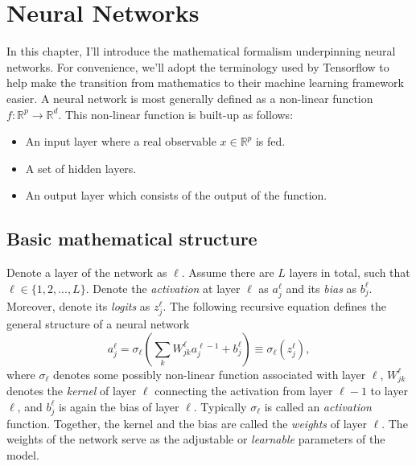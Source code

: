 \section{Neural Networks}\label{sec:neural_networks}
In this chapter, I'll introduce the mathematical formalism underpinning
neural networks. For convenience, we'll adopt the terminology used by Tensorflow\cite{tf} 
to help make the transition from mathematics to their machine learning framework easier.
A neural network is most generally defined as a non-linear function $f : \mathbb{R}^p \to \mathbb{R}^d$. This non-linear function is built-up as follows:
\begin{itemize}
    \item An input layer where a real observable $x \in \mathbb{R}^p$ is fed.
    \item A set of hidden layers.
    \item An output layer which consists of the output of the function.
\end{itemize}

\subsection{Basic mathematical structure}
Denote a layer of the network as $\ell$. Assume there are $L$ layers in total, such that $\ell \in \{1,2,...,L\}$. 
Denote the \textit{activation} at layer $\ell$ as $a_j^\ell$ and its \textit{bias} as $b_j^\ell$. 
Moreover, denote its \textit{logits} as $z_j^\ell$. The following recursive equation 
defines the general structure of a neural network
\begin{equation}
    a_j^\ell = \sigma_\ell \left(\sum_k W_{jk}^\ell a_j^{\ell - 1} + b_j^\ell\right) \equiv \sigma_\ell(z_j^\ell), 
\end{equation}
where $\sigma_\ell$ denotes some possibly non-linear function associated 
with layer $\ell$, $W_{jk}^\ell$ denotes the \textit{kernel} of layer $\ell$ connecting the activation from layer $\ell-1$ to layer $\ell$, 
and $b_j^\ell$ is again the bias of layer $\ell$. Typically $\sigma_\ell$ is called an \textit{activation} function. 
Together, the kernel and the bias are called the \textit{weights} of layer $\ell$. 
The weights of the network serve as the adjustable or \textit{learnable} parameters of the model.

